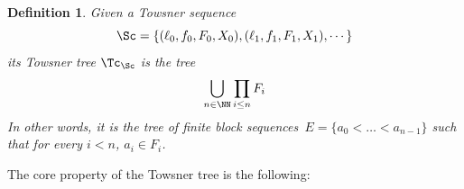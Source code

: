\documentclass{article}
\numberwithin{theorem}{section}
\newtheorem{proposition}[theorem]{Proposition}
\newtheorem{definition}[theorem]{Definition}
\begin{document}
\begin{definition}
Given a Towsner sequence
$$\Sc = \{(\ell_0, f_0, F_0, X_0), (\ell_1, f_1, F_1, X_1), \cdots \}$$
its \emph{Towsner tree} $\Tc_{\Sc}$ is the tree
$$
\bigcup_{n \in \NN} \prod_{i \leq n} F_i
$$
In other words, it is the tree of finite block sequences~$E = \{ a_0 < \dots < a_{n-1} \}$ such that for every $i < n$, $a_i \in F_i$.
\end{definition}

The core property of the Towsner tree is the following:

\end{document}
